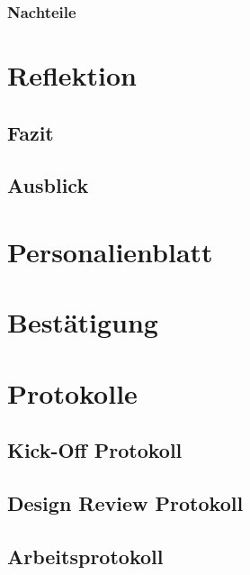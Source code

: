 \documentclass[
11pt, %
a4paper, %
BCOR25mm, %
DIV14, %
footsepline = false, %
headsepline, %
twoside, %
openright,
abstracton, %
listof=totocnumbered, %
bibliography=totocnumbered %
]{scrreprt}
\begin{document}
  \subsection{Nachteile}
  
  \chapter{Reflektion}
  \section{Fazit}
  \section{Ausblick}
  
  \appendix
  
  \chapter{Personalienblatt}
  
  
  \chapter{Bestätigung}
  
  
  \listoffigures
  \listoftables
  
  
  
  
  \chapter{Protokolle}
  \section{Kick-Off Protokoll}
  \section{Design Review Protokoll}
  \section{Arbeitsprotokoll}
\end{document}
